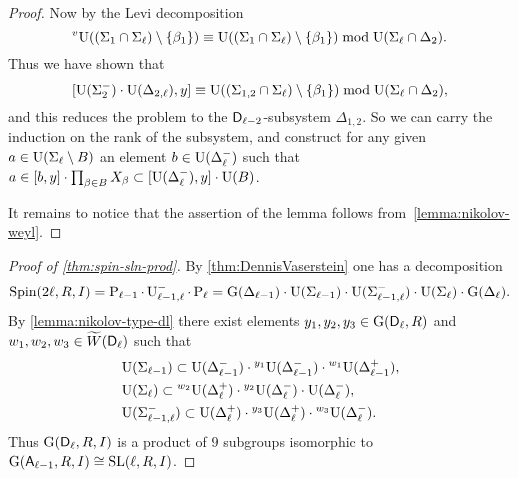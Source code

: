 \begin{proof}
Now by the Levi decomposition
\[ {}^v\!\operatorname{U}((\Sigma_1\cap\Sigma_\ell)\setminus\{\beta_1\}) \equiv \operatorname{U}((\Sigma_1\cap\Sigma_\ell)\setminus\{\beta_1\}) \bmod \operatorname{U}(\Sigma_\ell\cap\Delta_2). \]
Thus we have shown that
\[ [\operatorname{U}(\Sigma_2^-)\cdot\operatorname{U}(\Delta_{2,\ell}),y] \equiv \operatorname{U}((\Sigma_{1,2}\cap\Sigma_\ell)\setminus\{\beta_1\}) \bmod \operatorname{U}(\Sigma_\ell\cap\Delta_2), \]
and this reduces the problem to the $\mathsf{D}_{\ell-2}$-subsystem $\Delta_{1,2}$. So we can carry the induction on the rank of the subsystem, and construct for any given $a\in\operatorname{U}(\Sigma_\ell\setminus B)$ an element $b\in\operatorname{U}(\Delta_\ell^-)$ such that $a\in[b,y]\cdot\prod_{\beta\in B}X_\beta\subset[\operatorname{U}(\Delta_\ell^-),y]\cdot\operatorname{U}(B)$.

It remains to notice that the assertion of the lemma follows from~\cref{lemma:nikolov-weyl}.
\end{proof}
\begin{proof}[Proof of \cref{thm:spin-sln-prod}]
By \cref{thm:DennisVaserstein} one has a decomposition
\[ \operatorname{Spin}(2\ell,R,I) = \operatorname{P}_{\ell-1}\cdot\operatorname{U}_{\ell-1,\ell}^-\cdot\operatorname{P}_{\ell} = \operatorname{G}(\Delta_{\ell-1})\cdot\operatorname{U}(\Sigma_{\ell-1})\cdot\operatorname{U}(\Sigma_{\ell-1,\ell}^-)\cdot\operatorname{U}(\Sigma_{\ell})\cdot\operatorname{G}(\Delta_\ell). \]
By \cref{lemma:nikolov-type-dl} there exist elements $y_1,y_2,y_3\in\operatorname{G}(\mathsf{D}_\ell,R)$ and $w_1,w_2,w_3\in\widetilde{W}(\mathsf{D}_\ell)$ such that
\begin{align*}
& \operatorname{U}(\Sigma_{\ell-1}) \subset \operatorname{U}(\Delta_{\ell-1}^-) \cdot {}^{y_1}\!\operatorname{U}(\Delta_{\ell-1}^-) \cdot {}^{w_1}\!\operatorname{U}(\Delta_{\ell-1}^+), \\
& \operatorname{U}(\Sigma_\ell) \subset {}^{w_2}\!\operatorname{U}(\Delta_\ell^+) \cdot {}^{y_2}\!\operatorname{U}(\Delta_\ell^-) \cdot \operatorname{U}(\Delta_\ell^-), \\
& \operatorname{U}(\Sigma_{\ell-1,\ell}^-) \subset \operatorname{U}(\Delta_\ell^+) \cdot {}^{y_3}\!\operatorname{U}(\Delta_\ell^+) \cdot {}^{w_3}\!\operatorname{U}(\Delta_\ell^-).
\end{align*}
Thus $\operatorname{G}(\mathsf{D}_\ell,R,I)$ is a product of $9$ subgroups isomorphic to $\operatorname{G}(\mathsf{A}_{\ell-1},R,I)\cong\operatorname{SL}(\ell,R,I)$.
\end{proof}